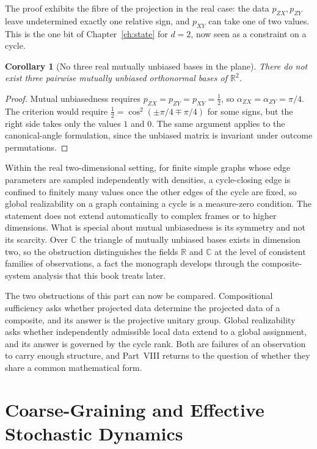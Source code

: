 \documentclass[11pt,oneside]{book}
\newtheorem{corollary}[theorem]{Corollary}
\theoremstyle{definition}
\theoremstyle{remark}
\begin{document}
The proof exhibits the fibre of the projection in the real case: the data $p_{ZX},p_{ZY}$ leave undetermined exactly one relative sign, and $p_{XY}$ can take one of two values. This is the one bit of Chapter~\ref{ch:state} for $d=2$, now seen as a constraint on a cycle.

\begin{corollary}[No three real mutually unbiased bases in the plane]
There do not exist three pairwise mutually unbiased orthonormal bases of $\mathbb R^2$.
\end{corollary}

\begin{proof}
Mutual unbiasedness requires $p_{ZX}=p_{ZY}=p_{XY}=\tfrac12$, so $\alpha_{ZX}=\alpha_{ZY}=\pi/4$. The criterion would require $\tfrac12=\cos^2(\pm\pi/4\mp\pi/4)$ for some signs, but the right side takes only the values $1$ and $0$. The same argument applies to the canonical-angle formulation, since the unbiased matrix is invariant under outcome permutations.
\end{proof}

Within the real two-dimensional setting, for finite simple graphs whose edge parameters are sampled independently with densities, a cycle-closing edge is confined to finitely many values once the other edges of the cycle are fixed, so global realizability on a graph containing a cycle is a measure-zero condition. The statement does not extend automatically to complex frames or to higher dimensions. What is special about mutual unbiasedness is its symmetry and not its scarcity. Over $\mathbb C$ the triangle of mutually unbiased bases exists in dimension two, so the obstruction distinguishes the fields $\mathbb R$ and $\mathbb C$ at the level of consistent families of observations, a fact the monograph develops through the composite-system analysis that this book treats later.

The two obstructions of this part can now be compared. Compositional sufficiency asks whether projected data determine the projected data of a composite, and its answer is the projective unitary group. Global realizability asks whether independently admissible local data extend to a global assignment, and its answer is governed by the cycle rank. Both are failures of an observation to carry enough structure, and Part~VIII returns to the question of whether they share a common mathematical form.

\chapter{Coarse-Graining and Effective Stochastic Dynamics}\label{ch:coarse}
\end{document}
